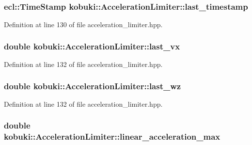 \subsubsection[{last\-\_\-timestamp}]{\setlength{\rightskip}{0pt plus 5cm}ecl\-::\-Time\-Stamp {\bf kobuki\-::\-Acceleration\-Limiter\-::last\-\_\-timestamp}\hspace{0.3cm}{\ttfamily  [private]}}\label{classkobuki_1_1AccelerationLimiter_aa09a6b30cb4807218a8c611a763c1314}


\-Definition at line 130 of file acceleration\-\_\-limiter.\-hpp.

\subsubsection[{last\-\_\-vx}]{\setlength{\rightskip}{0pt plus 5cm}double {\bf kobuki\-::\-Acceleration\-Limiter\-::last\-\_\-vx}\hspace{0.3cm}{\ttfamily  [private]}}\label{classkobuki_1_1AccelerationLimiter_a1af05999946b0cdcbe2ab0935b1ccbf8}


\-Definition at line 132 of file acceleration\-\_\-limiter.\-hpp.

\subsubsection[{last\-\_\-wz}]{\setlength{\rightskip}{0pt plus 5cm}double {\bf kobuki\-::\-Acceleration\-Limiter\-::last\-\_\-wz}\hspace{0.3cm}{\ttfamily  [private]}}\label{classkobuki_1_1AccelerationLimiter_a2d1c0d363ba76e38bd56ecc572416682}


\-Definition at line 132 of file acceleration\-\_\-limiter.\-hpp.

\subsubsection[{linear\-\_\-acceleration\-\_\-max}]{\setlength{\rightskip}{0pt plus 5cm}double {\bf kobuki\-::\-Acceleration\-Limiter\-::linear\-\_\-acceleration\-\_\-max}\hspace{0.3cm}{\ttfamily  [private]}}\label{classkobuki_1_1AccelerationLimiter_ae3590371d3d9ffe38481162d41ad7537}



